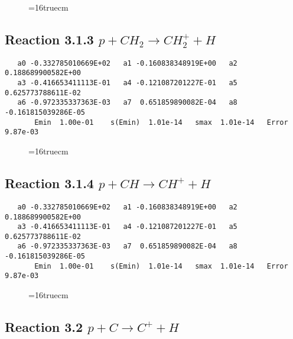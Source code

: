 \documentclass[12pt]{article}
\begin{document}
\begin{figure} \label{met.1_3.1.2}
\epsfxsize=16truecm
\end{figure}
\newpage

\subsection{ 
Reaction 3.1.3    $p + CH_2 \rightarrow CH_2^+ + H$
}

\begin{small}\begin{verbatim} 
   a0 -0.332785010669E+02   a1 -0.160838348919E+00   a2  0.188689900582E+00
   a3 -0.416653411113E-01   a4 -0.121087201227E-01   a5  0.625773788611E-02
   a6 -0.972335337363E-03   a7  0.651859890082E-04   a8 -0.161815039286E-05
       Emin  1.00e-01    s(Emin)  1.01e-14   smax  1.01e-14   Error  9.87e-03
\end{verbatim}\end{small}

\begin{figure} \label{met.1_3.1.3}
\epsfxsize=16truecm
\end{figure}
\newpage
 
 
\subsection{ 
Reaction 3.1.4    $p + CH \rightarrow CH^+ + H$
}

\begin{small}\begin{verbatim} 
   a0 -0.332785010669E+02   a1 -0.160838348919E+00   a2  0.188689900582E+00
   a3 -0.416653411113E-01   a4 -0.121087201227E-01   a5  0.625773788611E-02
   a6 -0.972335337363E-03   a7  0.651859890082E-04   a8 -0.161815039286E-05
       Emin  1.00e-01    s(Emin)  1.01e-14   smax  1.01e-14   Error  9.87e-03
\end{verbatim}\end{small}
 
\begin{figure} \label{met.1_3.1.4}
\epsfxsize=16truecm
\end{figure}
\newpage

\subsection{
Reaction 3.2      $p + C \rightarrow C^+ + H$
}
\end{document}

